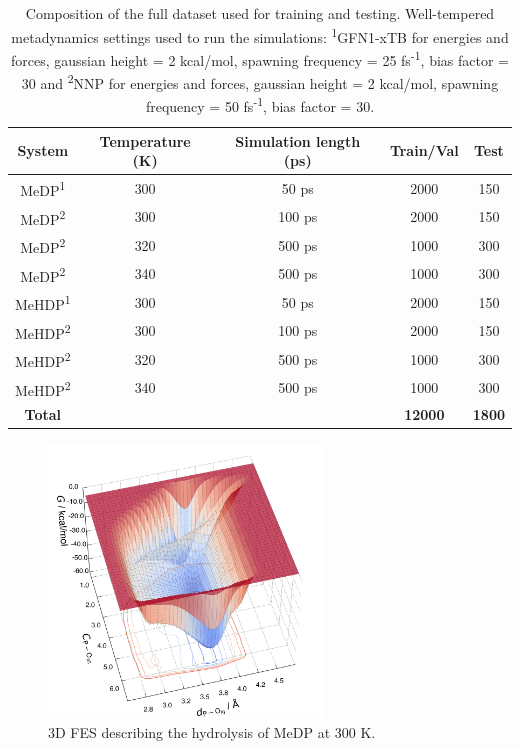 \begin{table}[htbp]
    \centering
    \caption{Composition of the full dataset used for training and testing. Well-tempered metadynamics settings used to run the simulations: \textsuperscript{1}GFN1-xTB for energies and forces, gaussian height = 2 kcal/mol, spawning frequency = 25 fs\textsuperscript{-1}, bias factor = 30 and  \textsuperscript{2}NNP for energies and forces, gaussian height = 2 kcal/mol, spawning frequency = 50 fs\textsuperscript{-1}, bias factor = 30.}
    \label{tab:full_dataset}
    \begin{tabular}{ccccc}
    \toprule
    \textbf{System} & \textbf{Temperature (K)} & \textbf{Simulation length (ps)} & \textbf{Train/Val} & \textbf{Test} \\
    \midrule
    MeDP\textsuperscript{1}  & 300 & 50 ps   & 2000 & 150 \\
    MeDP\textsuperscript{2}  & 300 & 100 ps & 2000 & 150 \\
    MeDP\textsuperscript{2}  & 320 & 500 ps  & 1000 & 300 \\
    MeDP\textsuperscript{2}  & 340 & 500 ps  & 1000 & 300 \\
    MeHDP\textsuperscript{1} & 300 & 50 ps  & 2000 & 150 \\
    MeHDP\textsuperscript{2} & 300 & 100 ps & 2000 & 150 \\
    MeHDP\textsuperscript{2} & 320 & 500 ps  & 1000 & 300 \\
    MeHDP\textsuperscript{2} & 340 & 500 ps  & 1000 & 300 \\
    \midrule
    \textbf{Total} & & & \textbf{12000} & \textbf{1800} \\
    \bottomrule
    \end{tabular}
\end{table}

\begin{figure}[htbp]
    \centering
    \includegraphics[width=0.65\textwidth]{Figures/Appendix/appendix_MeDP_300K_fes_3d.png}
    \caption{3D FES describing the hydrolysis of MeDP at 300 K.}
    \label{fig:fes_3d_medp_300k}
\end{figure}

